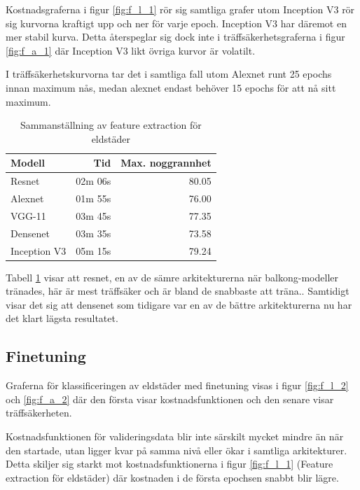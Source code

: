 \documentclass[]{kththesis}
\begin{document}
Kostnadsgraferna i figur \ref{fig:f_l_1} rör sig samtliga grafer utom Inception V3 rör sig kurvorna kraftigt upp och ner för varje epoch. 
Inception V3 har däremot en mer stabil kurva. 
Detta återspeglar sig dock inte i träffsäkerhetsgraferna i figur \ref{fig:f_a_1} där Inception V3 likt övriga kurvor är volatilt.

I träffsäkerhetskurvorna tar det i samtliga fall utom Alexnet runt 25 epochs innan maximum nås, medan alexnet endast behöver 15 epochs för att nå sitt maximum.


\begin{table}[!htbp]
  \centering
  \begin{tabular}{|l|r|r|}
    Modell & Tid & Max. noggrannhet \\ 
    \hline
    Resnet       & 02m 06s & 80.05 \\
    Alexnet      & 01m 55s & 76.00 \\
    VGG-11       & 03m 45s & 77.35 \\
    Densenet     & 03m 35s & 73.58 \\
    Inception V3 & 05m 15s & 79.24 \\
  \end{tabular}
  \caption{Sammanställning av feature extraction för eldstäder}
  \label{fig:sam_3}
\end{table}


Tabell \ref{fig:sam_3} visar att resnet, en av de sämre arkitekturerna när balkong-modeller tränades, här är mest träffsäker och är bland de snabbaste att träna..
Samtidigt visar det sig att densenet som tidigare var en av de bättre arkitekturerna nu har det klart lägsta resultatet.

\subsection{Finetuning}
Graferna för klassificeringen av eldstäder med finetuning visas i figur \ref{fig:f_l_2} och \ref{fig:f_a_2} där den första visar kostnadsfunktionen och den senare visar träffsäkerheten.

Kostnadsfunktionen för valideringsdata blir inte särskilt mycket mindre än när den startade, utan ligger kvar på samma nivå eller ökar i samtliga arkitekturer.
Detta skiljer sig starkt mot kostnadsfunktionerna i figur \ref{fig:f_l_1} (Feature extraction för eldstäder) där kostnaden i de första epochsen snabbt blir lägre. 
\end{document}
